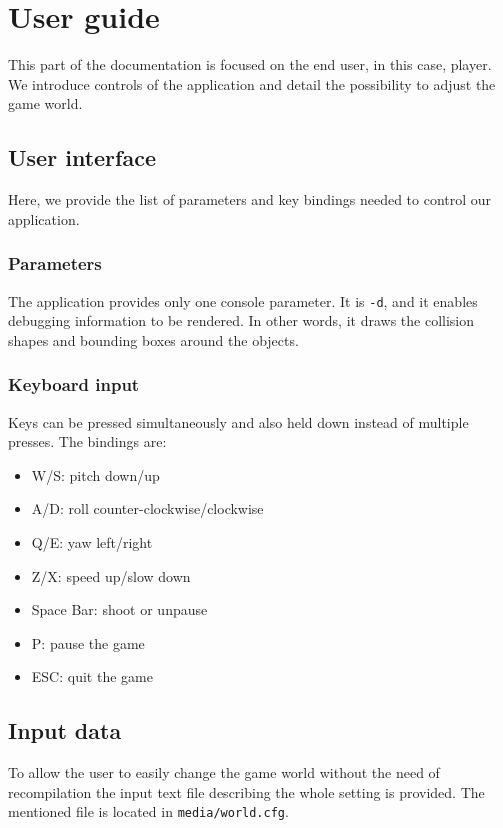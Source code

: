 \chapter{User guide}
This part of the documentation is focused on the end user, in this case, player. We introduce controls of the application and detail the possibility to adjust the game world.
\section{User interface}
Here, we provide the list of parameters and key bindings needed to control our application.
\subsection*{Parameters}
The application provides only one console parameter. It is {\tt -d}, and it enables debugging information to be rendered. In other words, it draws the collision shapes and bounding boxes around the objects.
\subsection*{Keyboard input}
Keys can be pressed simultaneously and also held down instead of multiple presses. The bindings are:
\begin{itemize}
\item W/S: pitch down/up
\item A/D: roll counter-clockwise/clockwise 
\item Q/E: yaw left/right
\item Z/X: speed up/slow down
\item Space Bar: shoot or unpause
\item P: pause the game
\item ESC: quit the game
\end{itemize}


\section{Input data}
\label{sec:data}
To allow the user to easily change the game world without the need of recompilation the input text file describing the whole setting is provided. The mentioned file is located in {\tt media/world.cfg}. 

